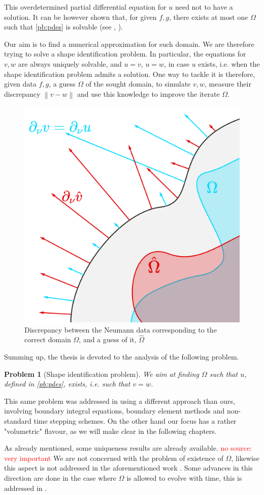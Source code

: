 \documentclass[english,a4paper,9pt,oneside]{scrbook}	%
\theoremstyle{break}
\newtheorem{pb}[equation]{Problem}
\theoremstyle{remark}
\newcommand{\norm}[1]{\left\lVert#1\right\rVert}
\begin{document}
This overdetermined partial differential equation for $u$ need not to have a solution. It can be however shown that, for given $f,g$, there exists at most one $\Omega$ such that \cref{pb:pdes} is solvable (see \cite{chapko1}, \cite{chapko2}).

Our aim is to find a numerical approximation for such domain. We are therefore trying to solve a shape identification problem. In particular, the equations for $v,w$ are always uniquely solvable, and $u=v$, $u=w$, in case $u$ exists, i.e. when the shape identification problem admits a solution. One way to tackle it is therefore, given data $f,g$, a guess $\Omega$ of the sought domain, to simulate $v,w$, measure their discrepancy $\norm{v-w}$ and use this knowledge to improve the iterate $\Omega$.

\begin{figure}[H]
\centering
\includegraphics[width=0.25\columnwidth]{Images/NormalDiscrepancy.pdf}
\caption{Discrepancy between the Neumann data corresponding to the correct domain $\Omega$, and a guess of it, $\hat{\Omega}$}\label{fig:normal_discrepancy}
\end{figure}

Summing up, the thesis is devoted to the analysis of the following problem.

\begin{pb}[Shape identification problem]
\label{pb:shid}
We aim at finding $\Omega$ such that $u$, defined in \cref{pb:pdes}, exists, i.e. such that $v=w$.
\end{pb}

This same problem was addressed in \cite{harbrecht} using a different approach than ours, involving boundary integral equations, boundary element methods and non-standard time stepping schemes. On the other hand our focus has a rather "volumetric" flavour, as we will make clear in the following chapters. 

As already mentioned, some uniqueness results are already available. \textcolor{red}{no source: very important} We are not concerned with the problem of existence of $\Omega$, likewise this aspect is not addressed in the aforementioned work \cite{harbrecht}. Some advances in this direction are done in the case where $\Omega$ is allowed to evolve with time, this is addressed in \cite{brugger}.
\end{document}
